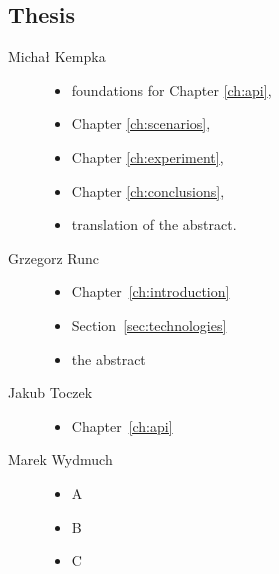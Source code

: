 	\subsection{Thesis}
	\begin{description}
		\item[Michał Kempka] \hfill
			\begin{itemize}
				\item foundations for Chapter \ref{ch:api},
				\item Chapter \ref{ch:scenarios},
				\item Chapter \ref{ch:experiment},
				\item Chapter \ref{ch:conclusions},
				\item translation of the abstract.
			\end{itemize}
		\item[Grzegorz Runc] \hfill
			\begin{itemize}
				\item Chapter~\ref{ch:introduction}
				\item Section~\ref{sec:technologies}
                \item the abstract
			\end{itemize}
		\item[Jakub Toczek] \hfill
			\begin{itemize}
				\item Chapter~\ref{ch:api}
			\end{itemize}
		\item[Marek Wydmuch] \hfill
			\begin{itemize}
				\item A
				\item B
				\item C
			\end{itemize}
	\end{description}
